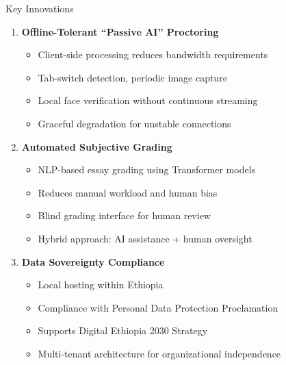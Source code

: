 \begin{frame}{Key Innovations}
    \begin{enumerate}
        \item \textbf{Offline-Tolerant ``Passive AI'' Proctoring}
        \begin{itemize}
            \item Client-side processing reduces bandwidth requirements
            \item Tab-switch detection, periodic image capture
            \item Local face verification without continuous streaming
            \item Graceful degradation for unstable connections
        \end{itemize}
        
        \item \textbf{Automated Subjective Grading}
        \begin{itemize}
            \item NLP-based essay grading using Transformer models
            \item Reduces manual workload and human bias
            \item Blind grading interface for human review
            \item Hybrid approach: AI assistance + human oversight
        \end{itemize}
        
        \item \textbf{Data Sovereignty Compliance}
        \begin{itemize}
            \item Local hosting within Ethiopia
            \item Compliance with Personal Data Protection Proclamation
            \item Supports Digital Ethiopia 2030 Strategy
            \item Multi-tenant architecture for organizational independence
        \end{itemize}
    \end{enumerate}
\end{frame}

